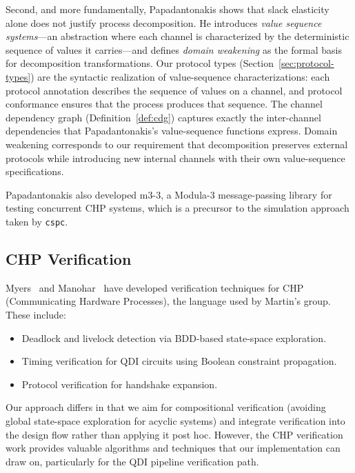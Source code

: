 \documentclass[11pt]{article}
\begin{document}
Second, and more fundamentally, Papadantonakis shows that slack
elasticity alone does not justify process decomposition.  He
introduces \emph{value sequence systems}---an abstraction where each
channel is characterized by the deterministic sequence of values it
carries---and defines \emph{domain weakening} as the formal basis for
decomposition transformations.  Our protocol types
(Section~\ref{sec:protocol-types}) are the syntactic realization of
value-sequence characterizations: each protocol annotation describes
the sequence of values on a channel, and protocol conformance ensures
that the process produces that sequence.  The channel dependency graph
(Definition~\ref{def:cdg}) captures exactly the inter-channel
dependencies that Papadantonakis's value-sequence functions express.
Domain weakening corresponds to our requirement that decomposition
preserves external protocols while introducing new internal channels
with their own value-sequence specifications.

Papadantonakis also developed m3-3, a Modula-3 message-passing
library for testing concurrent CHP systems, which is a precursor
to the simulation approach taken by \texttt{cspc}.

\subsection{CHP Verification}

Myers~\cite{myers2001} and Manohar~\cite{manohar2001} have developed
verification techniques for CHP (Communicating Hardware Processes),
the language used by Martin's group.  These include:
\begin{itemize}
\item Deadlock and livelock detection via BDD-based state-space
  exploration.
\item Timing verification for QDI circuits using Boolean constraint
  propagation.
\item Protocol verification for handshake expansion.
\end{itemize}

Our approach differs in that we aim for compositional verification
(avoiding global state-space exploration for acyclic systems) and
integrate verification into the design flow rather than applying it
post hoc.  However, the CHP verification work provides valuable
algorithms and techniques that our implementation can draw on,
particularly for the QDI pipeline verification path.
\end{document}
